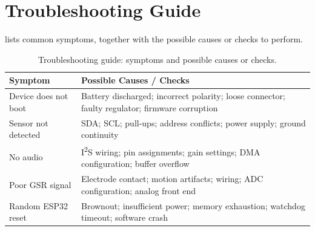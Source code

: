 \section{Troubleshooting Guide}
\label{sec:troubleshooting-guide}

 lists common symptoms, together with the possible causes or checks to perform.

\begin{table}[t]
\centering
\caption{Troubleshooting guide: symptoms and possible causes or checks.}
\label{tab:troubleshooting-guide}
\small
\begin{tabularx}{\textwidth}{@{}l Y@{}}
\toprule
\textbf{Symptom} & \textbf{Possible Causes / Checks} \\
\midrule
Device does not boot & Battery discharged; incorrect polarity; loose connector; faulty regulator; firmware corruption \\
Sensor not detected & SDA; SCL; pull-ups; address conflicts; power supply; ground continuity \\
No audio & I\textsuperscript{2}S wiring; pin assignments; gain settings; DMA configuration; buffer overflow \\
Poor GSR signal & Electrode contact; motion artifacts; wiring; ADC configuration; analog front end \\
Random ESP32 reset & Brownout; insufficient power; memory exhaustion; watchdog timeout; software crash \\
\bottomrule
\end{tabularx}
\end{table}
